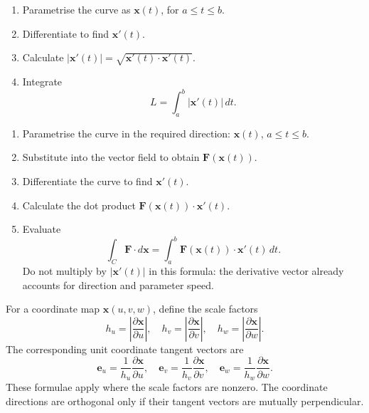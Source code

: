 \begin{nmeth}
  \begin{enumerate} \emph{}
    \item Parametrise the curve as $\mathbf{x}(t)$, for $a\leq t\leq b$.
    \item Differentiate to find $\mathbf{x}'(t)$.
    \item Calculate $|\mathbf{x}'(t)|=\sqrt{\mathbf{x}'(t)\cdot\mathbf{x}'(t)}$.
    \item Integrate
    \[
      L=\int_a^b |\mathbf{x}'(t)|\,dt.
    \]
  \end{enumerate}
\end{nmeth}

\begin{nmeth}
  \begin{enumerate} \emph{}
    \item Parametrise the curve in the required direction: $\mathbf{x}(t)$, $a\leq t\leq b$.
    \item Substitute into the vector field to obtain $\mathbf{F}(\mathbf{x}(t))$.
    \item Differentiate the curve to find $\mathbf{x}'(t)$.
    \item Calculate the dot product $\mathbf{F}(\mathbf{x}(t))\cdot\mathbf{x}'(t)$.
    \item Evaluate
    \[
      \int_C\mathbf{F}\cdot d\mathbf{x}
      =\int_a^b\mathbf{F}(\mathbf{x}(t))\cdot\mathbf{x}'(t)\,dt.
    \]
    Do not multiply by $|\mathbf{x}'(t)|$ in this formula: the derivative vector already accounts for direction and parameter speed.
  \end{enumerate}
\end{nmeth}

\begin{nmeth}
  For a coordinate map $\mathbf{x}(u,v,w)$, define the scale factors
  \[
    h_u=\left|\frac{\partial\mathbf{x}}{\partial u}\right|,
    \quad
    h_v=\left|\frac{\partial\mathbf{x}}{\partial v}\right|,
    \quad
    h_w=\left|\frac{\partial\mathbf{x}}{\partial w}\right|.
  \]
  The corresponding unit coordinate tangent vectors are
  \[
    \mathbf{e}_u=\frac{1}{h_u}\frac{\partial\mathbf{x}}{\partial u},
    \quad
    \mathbf{e}_v=\frac{1}{h_v}\frac{\partial\mathbf{x}}{\partial v},
    \quad
    \mathbf{e}_w=\frac{1}{h_w}\frac{\partial\mathbf{x}}{\partial w}.
  \]
  These formulae apply where the scale factors are nonzero. The coordinate directions are orthogonal only if their tangent vectors are mutually perpendicular.
\end{nmeth}

